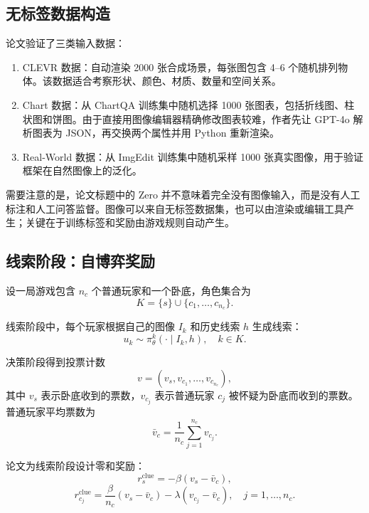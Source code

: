 \subsection{无标签数据构造}

论文验证了三类输入数据：

\begin{enumerate}
    \item CLEVR 数据：自动渲染 2000 张合成场景，每张图包含 4--6 个随机排列物体。该数据适合考察形状、颜色、材质、数量和空间关系。
    \item Chart 数据：从 ChartQA 训练集中随机选择 1000 张图表，包括折线图、柱状图和饼图。由于直接用图像编辑器精确修改图表较难，作者先让 GPT-4o 解析图表为 JSON，再交换两个属性并用 Python 重新渲染。
    \item Real-World 数据：从 ImgEdit 训练集中随机采样 1000 张真实图像，用于验证框架在自然图像上的泛化。
\end{enumerate}

需要注意的是，论文标题中的 Zero 并不意味着完全没有图像输入，而是没有人工标注和人工问答监督。图像可以来自无标签数据集，也可以由渲染或编辑工具产生；关键在于训练标签和奖励由游戏规则自动产生。

\subsection{线索阶段：自博弈奖励}

设一局游戏包含 $n_c$ 个普通玩家和一个卧底，角色集合为
\begin{equation}
    K = \{s\} \cup \{c_1,\ldots,c_{n_c}\}.
\end{equation}

线索阶段中，每个玩家根据自己的图像 $I_k$ 和历史线索 $h$ 生成线索：
\begin{equation}
    u_k \sim \pi_{\theta}^{k}(\cdot \mid I_k, h), \quad k \in K.
\end{equation}

决策阶段得到投票计数
\begin{equation}
    v = (v_s, v_{c_1}, \ldots, v_{c_{n_c}}),
\end{equation}
其中 $v_s$ 表示卧底收到的票数，$v_{c_j}$ 表示普通玩家 $c_j$ 被怀疑为卧底而收到的票数。普通玩家平均票数为
\begin{equation}
    \bar{v}_c = \frac{1}{n_c}\sum_{j=1}^{n_c} v_{c_j}.
\end{equation}

论文为线索阶段设计零和奖励：
\begin{equation}
    r_s^{\text{clue}} = -\beta (v_s - \bar{v}_c),
\end{equation}
\begin{equation}
    r_{c_j}^{\text{clue}} =
    \frac{\beta}{n_c}(v_s - \bar{v}_c)
    - \lambda (v_{c_j} - \bar{v}_c), \quad j=1,\ldots,n_c.
\end{equation}

